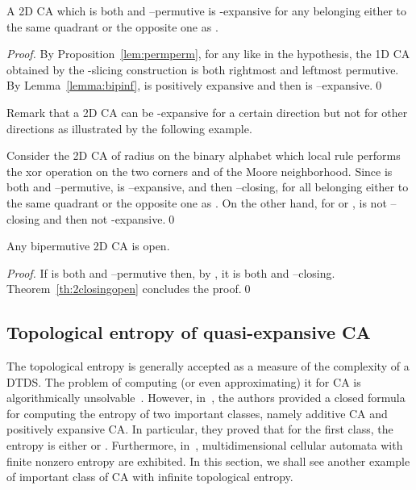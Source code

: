 \documentclass{llncs}
\newcommand{\ignore}[1]{}
\begin{document}
\begin{proposition}
\label{prop:bipexp} A 2D CA  which is both  and
--permutive is -expansive for any  belonging either to the same quadrant or the opposite one as .
\end{proposition}
\begin{proof}
By Proposition~\ref{lem:permperm}, for any  like in the hypothesis, the 1D CA  obtained by
the -slicing construction is both rightmost and leftmost
permutive. By Lemma~\ref{lemma:bipinf},  is
positively expansive and then  is --expansive.\qed
\end{proof}
Remark that 
a 2D CA can be -expansive for a certain direction  but not
for other directions as illustrated by the following example.
\begin{example}\label{ex:1}
Consider the 2D CA  of radius  on the binary alphabet
which local rule performs the xor operation on the two corners
 and  of the Moore neighborhood.
Since  is both  and --permutive,  is
--expansive, and then --closing, for all belonging either to the same quadrant or the opposite one as . 
On the other hand, for  or
,  is not --closing and then not
-expansive.\qed
\end{example}
\begin{proposition}
Any bipermutive 2D CA  is open.
\end{proposition}
\begin{proof}
If  is both  and --permutive then, 
by \cite[Prop. 5]{dennunzio08}, it is both  and --closing.
Theorem~\ref{th:2closingopen} concludes the proof.\qed
\ignore{
Assume that  is both  and --permutive.
Let  be such that  and
. By Proposition~\ref{prop:bipexp},  is both
 and --expansive, and then, by
Theorem~\ref{th:expclosing}, it is  closing.
Theorem~\ref{th:4closingopen} concludes the proof.
}
\end{proof}


\subsection{Topological entropy of quasi-expansive CA}
The topological entropy is generally accepted as a measure of the complexity of a DTDS. The problem of computing (or even approximating) it for CA is algorithmically 
unsolvable~\cite{hurd92}. However, in~\cite{damico03}, the authors
provided a closed formula for computing the entropy of two important classes, namely additive CA and positively expansive CA.
In particular, they proved that for the first class, the entropy is either 
 or . Furthermore, in~\cite{mey08}, multidimensional cellular automata with finite nonzero entropy are exhibited. In this section, we shall see
another example of important class of CA with infinite topological entropy.
\end{document}
